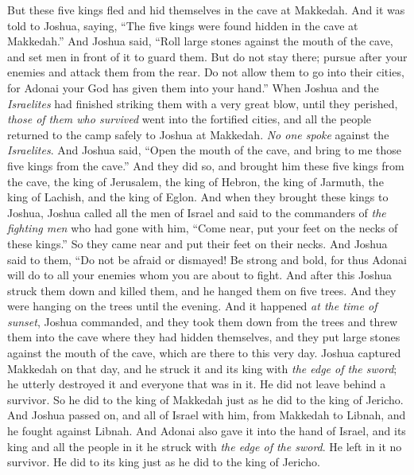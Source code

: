 \begin{biblechapter}
 But these five kings fled and hid themselves in the cave at Makkedah.
\verse And it was told to Joshua, saying, “The five kings were found hidden in the cave at Makkedah.”
\verse And Joshua said, “Roll large stones against the mouth of the cave, and set men in front of it to guard them.
\verse But do not stay there; pursue after your enemies and attack them from the rear. Do not allow them to go into their cities, for Adonai your God has given them into your hand.”
\verse When Joshua and the \textit{Israelites} had finished striking them with a very great blow, until they perished, \textit{those of them who survived} went into the fortified cities,
\verse and all the people returned to the camp safely to Joshua at Makkedah. \textit{No one spoke} against the \textit{Israelites}.
\verse And Joshua said, “Open the mouth of the cave, and bring to me those five kings from the cave.”
\verse And they did so, and brought him these five kings from the cave, the king of Jerusalem, the king of Hebron, the king of Jarmuth, the king of Lachish, and the king of Eglon.
\verse And when they brought these kings to Joshua, Joshua called all the men of Israel and said to the commanders of \textit{the fighting men} who had gone with him, “Come near, put your feet on the necks of these kings.” So they came near and put their feet on their necks.
\verse And Joshua said to them, “Do not be afraid or dismayed! Be strong and bold, for thus Adonai will do to all your enemies whom you are about to fight.
\verse And after this Joshua struck them down and killed them, and he hanged them on five trees. And they were hanging on the trees until the evening.
\verse And it happened \textit{at the time of sunset}, Joshua commanded, and they took them down from the trees and threw them into the cave where they had hidden themselves, and they put large stones against the mouth of the cave, which are there to this very day.
\verse Joshua captured Makkedah on that day, and he struck it and its king with \textit{the edge of the sword}; he utterly destroyed it and everyone that was in it. He did not leave behind a survivor. So he did to the king of Makkedah just as he did to the king of Jericho.
 And Joshua passed on, and all of Israel with him, from Makkedah to Libnah, and he fought against Libnah.
\verse And Adonai also gave it into the hand of Israel, and its king and all the people in it he struck with \textit{the edge of the sword}. He left in it no survivor. He did to its king just as he did to the king of Jericho.

\end{biblechapter}
